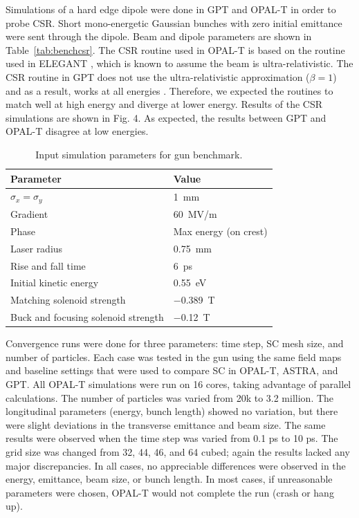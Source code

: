 \documentclass{iitthesis}
\begin{document}
Simulations  of  a  hard  edge  dipole  were  done  in  GPT  
and   OPAL-T   in   order   to   probe   CSR.   Short   
mono-energetic  Gaussian  bunches  with  zero  initial  emittance  
were sent through the dipole. Beam and dipole parameters 
are shown in Table~\ref{tab:benchcsr}. 
The CSR routine used in OPAL-T is based on 
the routine  used  in  ELEGANT  \cite{elegant}, which is known to assume  
the beam is ultra-relativistic. The CSR routine in GPT  
does  not  use  the  ultra-relativistic  approximation ($\beta=1$) 
and  as  a  result,  works  at  all energies  \cite{gptcsr}.  
Therefore, we expected  the  routines  to  match  well  at  high  energy  and  
diverge  at  lower  energy.  Results  of  the  CSR  simulations  
are  shown  in  Fig.  4.  As  expected,  the  results  between  
GPT and OPAL-T disagree at low energies. 
\begin{table}
	\begin{center}
		\begin{tabular}{l l} 
			\toprule
			\textbf{Parameter} & \textbf{Value} \\ 
			\midrule
			$\sigma_x =\sigma_y$ & \SI{1}{mm} \\
			\addlinespace[-1em] 
			Gradient & \SI{60}{MV/m} \\
			\addlinespace[-1em] 
			Phase & Max energy (on crest) \\
			\addlinespace[-1em] 
			Laser radius & \SI{0.75}{mm} \\
			\addlinespace[-1em] 
			Rise and fall time & \SI{6}{ps} \\
			\addlinespace[-1em] 
			Initial kinetic energy & \SI{0.55}{eV} \\
			\addlinespace[-1em] 
			Matching solenoid strength & \SI{-0.389}{T} \\
			\addlinespace[-1em] 
			Buck and focusing solenoid strength & \SI{-0.12}{T} \\
			\bottomrule			
		\end{tabular}
	\end{center}
	\caption{Input simulation parameters for gun benchmark.}
\end{table}\label{tab:benchcsr}


Convergence runs were done for three parameters: 
time step,  SC  mesh  size,  and  number  of  particles.  
Each  case was tested in the gun using the same field maps and 
baseline  settings  that  were  used  to  compare  SC  in  OPAL-T,  
ASTRA, and GPT. All OPAL-T simulations were run on 
16 cores, taking advantage of parallel calculations. 
The number of particles was varied from 20k to 3.2  million.  
The  longitudinal  parameters  (energy,  bunch length)  
showed  no  variation,  but  there  were  slight  deviations 
in the transverse emittance and beam size. The same results 
were observed when the time step was varied from 0.1 ps  to  10  ps.  
The  grid  size  was  changed  from  32,  44,  46, and 64 cubed; 
again the results lacked any major discrepancies.  
In all cases, no appreciable differences were observed in the energy,
emittance, beam size, or bunch length. In  most  cases,  
if unreasonable  parameters  were chosen, 
OPAL-T would not complete the run (crash or hang up).  
\end{document}
